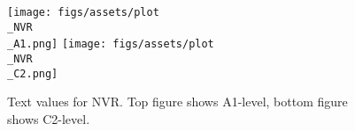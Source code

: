 \begin{figure}[ht]
    \centering
    \texttt{[image: figs/assets/plot\\\_NVR\\\_A1.png]}
    \texttt{[image: figs/assets/plot\\\_NVR\\\_C2.png]}
    \caption{
        \centering
        Text values for NVR. Top figure shows A1-level, bottom figure shows C2-level.
    }
    \label{fig:wit-nvr-topics}
\end{figure}